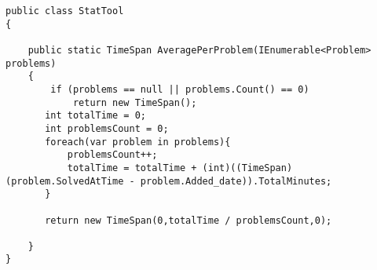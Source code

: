 \begin{lstlisting}[style=sourceCode, caption=\myCaption{The AveragePerProblem(IEnumerable<Problem> problems) method -- which is found in the \cl{StatTool} class.}, label=lst:averageperproblem]
public class StatTool
{
   
    public static TimeSpan AveragePerProblem(IEnumerable<Problem> problems)
    {
        if (problems == null || problems.Count() == 0)
            return new TimeSpan();
       int totalTime = 0; 
       int problemsCount = 0;
       foreach(var problem in problems){
           problemsCount++;
           totalTime = totalTime + (int)((TimeSpan)(problem.SolvedAtTime - problem.Added_date)).TotalMinutes;
       }

       return new TimeSpan(0,totalTime / problemsCount,0);
       
    }
}
\end{lstlisting}
